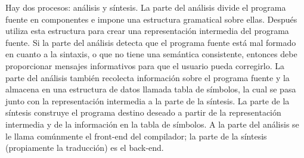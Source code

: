 Hay dos procesos: análisis y síntesis. La parte del análisis divide el programa fuente en componentes e impone una estructura gramatical sobre ellas. Después utiliza esta estructura para crear una representación intermedia del programa fuente. Si la parte del análisis detecta que el programa fuente está mal formado en cuanto a la sintaxis, o que no tiene una semántica consistente, entonces debe proporcionar mensajes informativos para que el usuario pueda corregirlo. La parte del análisis también recolecta información sobre el programa fuente y la almacena en una estructura de datos llamada tabla de símbolos, la cual se pasa junto con la representación intermedia a la parte de la síntesis. La parte de la síntesis construye el programa destino deseado a partir de la representación intermedia y de la información en la tabla de símbolos. A la parte del análisis se le llama comúnmente el front-end del compilador; la parte de la síntesis (propiamente la traducción) es el back-end.




